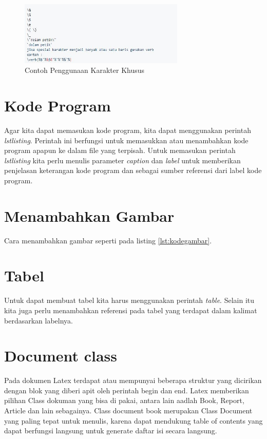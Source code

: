 \begin{figure}[!htbp]
	\centerline{\includegraphics[width=0.70\textwidth]{figures/1.JPG}}
	\caption{Contoh Penggunaan Karakter Khusus}
	\label{KarakterKhusus}
\end{figure}


\section{Kode Program}
Agar kita dapat memasukan kode program, kita dapat menggunakan perintah \textit{lstlisting}. Perintah ini  berfungsi untuk memasukkan atau menambahkan kode program apapun ke dalam file yang terpisah. Untuk memasukan perintah \textit{lstlisting} kita perlu menulis parameter \textit{caption} dan \textit{label} untuk memberikan penjelasan keterangan kode program dan sebagai sumber referensi dari label kode program.



\section{Menambahkan Gambar}
Cara menambahkan gambar seperti pada listing \ref{lst:kodegambar}.



\section{Tabel}
Untuk dapat membuat tabel kita harus menggunakan perintah \textit{table}. Selain itu kita juga perlu menambahkan referensi pada tabel yang terdapat dalam kalimat berdasarkan labelnya. 

\section{Document class}

Pada dokumen Latex terdapat atau mempunyai beberapa struktur yang dicirikan dengan blok yang diberi apit oleh perintah begin dan end. Latex memberikan pilihan Class dokuman yang bisa di pakai, antara lain aadlah Book, Report, Article dan lain sebagainya. Class document book merupakan Class Document yang paling tepat untuk menulis, karena dapat mendukung table of contents yang dapat berfungsi langsung untuk generate daftar isi secara langsung.

